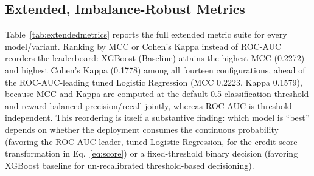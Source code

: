 \documentclass[journal]{IEEEtran}
\begin{document}
\subsection{Extended, Imbalance-Robust Metrics}

Table~\ref{tab:extendedmetrics} reports the full extended metric suite for every model/variant. Ranking by MCC or Cohen's Kappa instead of ROC-AUC reorders the leaderboard: XGBoost (Baseline) attains the highest MCC (0.2272) and highest Cohen's Kappa (0.1778) among all fourteen configurations, ahead of the ROC-AUC-leading tuned Logistic Regression (MCC 0.2223, Kappa 0.1579), because MCC and Kappa are computed at the default 0.5 classification threshold and reward balanced precision/recall jointly, whereas ROC-AUC is threshold-independent. This reordering is itself a substantive finding: which model is ``best'' depends on whether the deployment consumes the continuous probability (favoring the ROC-AUC leader, tuned Logistic Regression, for the credit-score transformation in Eq.~\ref{eq:score}) or a fixed-threshold binary decision (favoring XGBoost baseline for un-recalibrated threshold-based decisioning).
\end{document}
